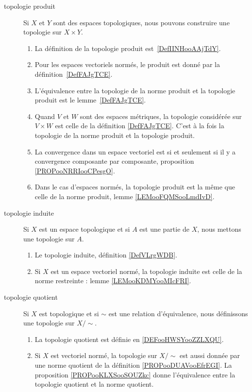 
       \label{THEMEooYRIWooDXZnhX}
\begin{description}
    \item[topologie produit] 
        Si \( X\) et \( Y\) sont des espaces topologiques, nous pouvons construire une topologie sur \( X\times Y\).
\begin{enumerate}
	\item
	      La définition de la topologie produit est~\ref{DefIINHooAAjTdY}.
	\item
	      Pour les espaces vectoriels normés, le produit est donné par la définition~\ref{DefFAJgTCE}.
	\item
	      L'équivalence entre la topologie de la norme produit et la topologie produit est le lemme~\ref{DefFAJgTCE}.
	\item
	      Quand \( V\) et \( W\) sont des espaces métriques, la topologie considérée sur \( V\times W\) est celle de la définition \ref{DefFAJgTCE}. C'est à la fois la topologie de la norme produit et la topologie produit.
	\item
	      La convergence dans un espace vectoriel est si et seulement si il y a convergence composante par composante, proposition \ref{PROPooNRRIooCPesgO}.
      \item Dans le cas d'espaces normés, la topologie produit est la même que celle de la norme produit, lemme \ref{LEMooFQMSooLmdIvD}.
\end{enumerate}
\item[topologie induite]
    Si \( X\) est un espace topologique et si \( A\) est une partie de \( X\), nous mettons une topologie sur \( A\).
    \begin{enumerate}
        \item Le topologie induite, définition \ref{DefVLrgWDB}.
        \item Si \( X\) est un espace vectoriel normé, la topologie induite est celle de la norme restreinte : lemme \ref{LEMooKDMYooMIcFRI}.
    \end{enumerate}
\item[topologie quotient]
    Si \( X\) est topologique et si \( \sim\) est une relation d'équivalence, nous définissons une topologie sur \( X/\sim\).
    \begin{enumerate}
        \item La topologie quotient est définie en \ref{DEFooHWSYooZZLXQU}.
        \item
            Si \( X\) est vectoriel normé, la topologie sur \( X/\sim\) est aussi donnée par une norme quotient de la définition \ref{PROPooDUAVooEfrEGI}. La proposition \ref{PROPooKLXSooSOUZkc} donne l'équivalence entre la topologie quotient et la norme quotient.

\end{enumerate}
\end{description}
